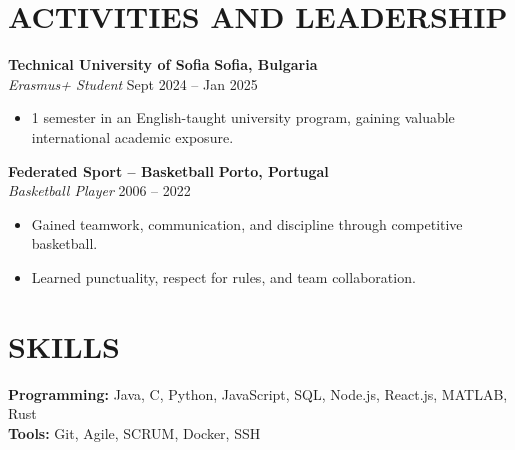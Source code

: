 \documentclass[10pt, letterpaper]{article}
\newenvironment{highlights}{
    \begin{itemize}[
        topsep=0.10 cm,
        parsep=0.10 cm,
        partopsep=0pt,
        itemsep=0pt,
        leftmargin=1cm %
    ]
}{
    \end{itemize}
}
\begin{document}
\section{ACTIVITIES AND LEADERSHIP}
\textbf{Technical University of Sofia} \hfill \textbf{Sofia, Bulgaria} \\
\textit{Erasmus+ Student} \hfill Sept 2024 – Jan 2025 \\
\begin{highlights}
    \item 1 semester in an English-taught university program, gaining valuable international academic exposure.
\end{highlights}

\textbf{Federated Sport – Basketball} \hfill \textbf{Porto, Portugal} \\
\textit{Basketball Player} \hfill 2006 – 2022 \\
\begin{highlights}
    \item Gained teamwork, communication, and discipline through competitive basketball.
    \item Learned punctuality, respect for rules, and team collaboration.
\end{highlights}

\section{SKILLS}
\textbf{Programming:} Java, C, Python, JavaScript, SQL, Node.js, React.js, MATLAB, Rust \\
\textbf{Tools:} Git, Agile, SCRUM, Docker, SSH
\end{document}
